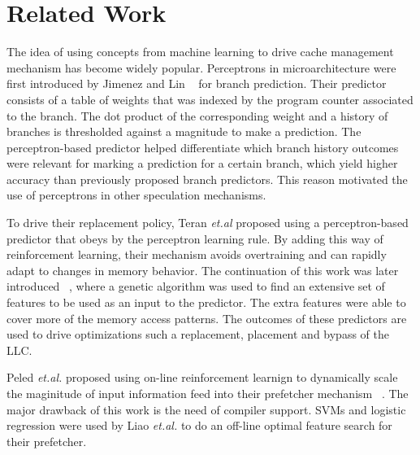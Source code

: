 \section{Related Work}
\label{related}


The idea of using concepts from machine learning to drive cache management mechanism has become widely popular. Perceptrons in microarchitecture were first introduced by Jimenez and Lin ~\cite{Perc_Branch} for branch prediction. Their predictor consists of a table of weights that was indexed by the program counter associated to the branch. The dot product of the corresponding weight and a history of branches is thresholded against a magnitude to make a prediction. The perceptron-based predictor helped differentiate which branch history outcomes were relevant for marking a prediction for a certain branch, which yield higher accuracy than previously proposed branch predictors. This reason motivated the use of perceptrons in other speculation mechanisms.

To drive their replacement policy, Teran \textit{et.al} proposed using a perceptron-based predictor that obeys by the perceptron learning rule. By adding this way of reinforcement learning, their mechanism avoids overtraining and can rapidly adapt to changes in memory behavior. The continuation of this work was later introduced ~\cite{Multiperspective}, where a genetic algorithm was used to find an extensive set of features to be used as an input to the predictor. The extra features were able to cover more of the memory access patterns. The outcomes of these predictors are used to drive optimizations such a replacement, placement and bypass of the LLC.   



Peled \textit{et.al.} proposed using on-line reinforcement learnign to dynamically scale the maginitude of input information feed into their prefetcher mechanism ~\cite{Semantics}. The major drawback of this work is the need of compiler support. SVMs and logistic regression were used by Liao \textit{et.al.} to do an off-line optimal feature search for their prefetcher.
